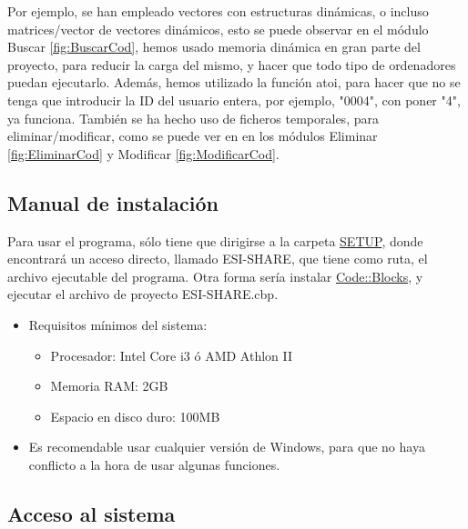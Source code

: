 \bigskip

Por ejemplo, se han empleado vectores con estructuras dinámicas, o incluso matrices/vector de vectores dinámicos, esto se puede observar en el módulo Buscar \ref{fig:BuscarCod},
hemos usado memoria dinámica en gran parte del proyecto, para reducir la carga del mismo, y hacer que todo tipo de ordenadores puedan ejecutarlo. 
Además, hemos utilizado la función atoi, para hacer que no se tenga que introducir la ID del usuario entera, por ejemplo, "0004", con poner "4", ya funciona.
También se ha hecho uso de ficheros temporales, para eliminar/modificar, como se puede ver en en los módulos Eliminar \ref{fig:EliminarCod} y Modificar \ref{fig:ModificarCod}.

\subsection{Manual de instalación}

Para usar el programa, sólo tiene que dirigirse a la carpeta \href{run:./../../SETUP}{SETUP}, donde encontrará un acceso directo, llamado ESI-SHARE, que tiene como ruta, el archivo ejecutable del programa.
Otra forma sería instalar \href{https://www.codeblocks.org/}{Code::Blocks}, y ejecutar el archivo de proyecto ESI-SHARE.cbp.
\newpage
\begin{itemize}
  \item Requisitos mínimos del sistema:
  \begin{itemize}
    \item Procesador: Intel Core i3 ó AMD Athlon II
    \item Memoria RAM: 2GB
    \item Espacio en disco duro: 100MB
  \end{itemize}
  \item Es recomendable usar cualquier versión de Windows, para que no haya conflicto a la hora de usar algunas funciones.
\end{itemize}

\bigskip

\subsection{Acceso al sistema}

